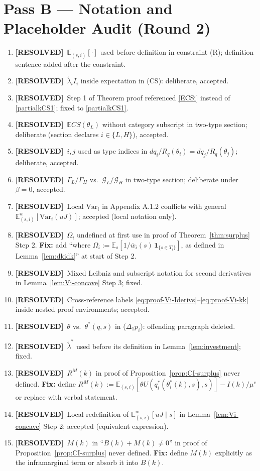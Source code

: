\documentclass{class}
\newcommand{\ok}{\textcolor{ok}{\textbf{[RESOLVED]}}}
\begin{document}
\section*{Pass B --- Notation and Placeholder Audit (Round 2)}

\begin{enumerate}[leftmargin=1.5cm]
\item \ok\ $\mathbb{E}_{(s,i)}[\cdot]$ used before definition in constraint (R); definition sentence added after the constraint.
\item \ok\ $\tilde\lambda_i I_i$ inside expectation in (CS): deliberate, accepted.
\item \ok\ Step 1 of Theorem proof referenced \eqref{ECSi} instead of \eqref{partialkCS1}; fixed to \eqref{partialkCS1}.
\item \ok\ $\mathbb{E}CS(\theta_L)$ without category subscript in two-type section; deliberate (section declares $i\in\{L,H\}$), accepted.
\item \ok\ $i,j$ used as type indices in $dq_i/R_q(\theta_i)=dq_j/R_q(\theta_j)$; deliberate, accepted.
\item \ok\ $\Gamma_L/\Gamma_H$ vs.\ $\mathcal{G}_L/\mathcal{G}_H$ in two-type section; deliberate under $\beta=0$, accepted.
\item \ok\ Local $\mathrm{Var}_i$ in Appendix A.1.2 conflicts with general $\mathbb{E}_{(s,i)}^w[\mathrm{Var}_i(uJ)]$; accepted (local notation only).
\item \ok\ $\Omega_i$ undefined at first use in proof of Theorem~\ref{thm:surplus} Step 2. \textbf{Fix:} add ``where $\Omega_i:=\mathbb{E}_s[1/\overline{w}_i(s)\,\mathbf{1}_{\{s\in T_i\}}]$, as defined in Lemma~\ref{lem:dkidk}'' at start of Step 2.
\item \ok\ Mixed Leibniz and subscript notation for second derivatives in Lemma~\ref{lem:Vi-concave} Step 3; fixed.
\item \ok\ Cross-reference labels \eqref{eq:proof-Vi-Iderivs}--\eqref{eq:proof-Vi-kk} inside nested proof environments; accepted.
\item \ok\ $\theta$ vs.\ $\theta^\ast(q,s)$ in ($\Delta_1 p_i$): offending paragraph deleted.
\item \ok\ $\tilde\lambda^\ast$ used before its definition in Lemma~\ref{lem:investment}; fixed.
\item \ok\ $R^M(k)$ in proof of Proposition~\ref{prop:CI-surplus} never defined. \textbf{Fix:} define $R^M(k):=\mathbb{E}_{(s,i)}[\theta U(q_i^\ast(\theta_i^\ast(k),s),s)]- I(k)/\mu^c$ or replace with verbal statement.
\item \ok\ Local redefinition of $\mathbb{E}_{(s,i)}^w[uJ\mid s]$ in Lemma~\ref{lem:Vi-concave} Step 2; accepted (equivalent expression).
\item \ok\ $M(k)$ in ``$B(k)+M(k)\neq 0$'' in proof of Proposition~\ref{prop:CI-surplus} never defined. \textbf{Fix:} define $M(k)$ explicitly as the inframarginal term or absorb it into $B(k)$.
\end{enumerate}
\end{document}

